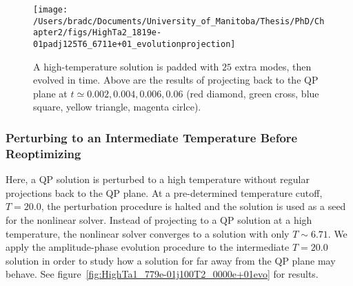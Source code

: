 \documentclass[../PhD.tex]{subfiles}
\begin{document}
\begin{figure}[h]
	\centering
	\texttt{[image: /Users/bradc/Documents/University\_of\_Manitoba/Thesis/PhD/Chapter2/figs/HighTa2\_1819e-01padj125T6\_6711e+01\_evolutionprojection]}
	\caption{A high-temperature solution is padded with $25$ extra modes, then evolved in time. Above are the results of projecting back to the QP plane at $t \simeq 0.002, 0.004, 0.006, 0.06$ (red diamond, green cross, blue square, yellow triangle, magenta cirlce).}
	\label{fig: HighTa2_1819e-01padj125T6_6711e+01_evolutionprojection}
\end{figure}



\subsubsection{Perturbing to an Intermediate Temperature Before Reoptimizing}

Here, a QP solution is perturbed to a high temperature without regular projections back to the QP plane. At a pre-determined temperature cutoff, $T = 20.0$, the perturbation procedure is halted and the solution is used as a seed for the nonlinear solver. Instead of projecting to a QP solution at a high temperature, the nonlinear solver converges to a solution with only $T \sim 6.71$. We apply the amplitude-phase evolution procedure to the intermediate $T = 20.0$ solution in order to study how a solution for far away from the QP plane may behave. See figure~\ref{fig:HighTa1_779e-01j100T2_0000e+01evo} for results.
\end{document}
